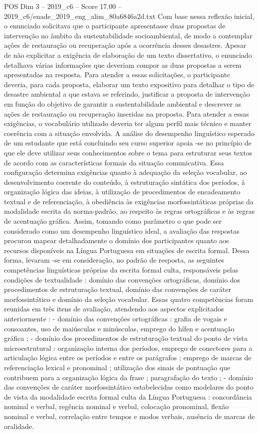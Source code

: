 \begin{textsample}{POS Dim 3 – 2019\_c6 – Score 17.00 – 2019\_c6/enade\_2019\_eng\_alim\_80a6846a2d.txt}
Com base nessa reflexão inicial, o enunciado solicitava que o participante apresentasse duas propostas de intervenção no âmbito da sustentabilidade socioambiental, de modo a contemplar ações de restauração ou recuperação após a ocorrência desses desastres.
Apesar de não explicitar a exigência de elaboração de um texto dissertativo, o enunciado detalhava várias informações que deveriam compor as duas propostas a serem apresentadas na resposta.
Para atender a essas solicitações, o participante deveria, para cada proposta, elaborar um texto expositivo para detalhar o tipo de desastre ambiental a que estava se referindo, justificar a proposta de intervenção em função do objetivo de garantir a sustentabilidade ambiental e descrever as ações de restauração ou recuperação inseridas na proposta.
Para atender a essas exigências, o vocabulário utilizado deveria ter algum perfil mais técnico e manter coerência com a situação envolvida.
A análise do desempenho linguístico esperado de um estudante que está concluindo seu curso superior apoia -se no princípio de que ele deve utilizar seus conhecimentos sobre o tema para estruturar seus textos de acordo com as características formais da situação comunicativa.
Essa configuração determina exigências quanto à adequação da seleção vocabular, ao desenvolvimento coerente do conteúdo, à estruturação sintática dos períodos, à organização lógica das ideias, à utilização de procedimentos de encadeamento textual e de referenciação, à obediência às exigências morfossintáticas próprias da modalidade escrita da norma-padrão, ao respeito às regras ortográficas e às regras de acentuação gráfica.
Assim, tomando como parâmetro o que pode ser considerado como um desempenho linguístico ideal, a avaliação das respostas procurou mapear detalhadamente o domínio dos participantes quanto aos recursos disponíveis na Língua Portuguesa em situações de escrita formal.
Dessa forma, levaram -se em consideração, no padrão de resposta, as seguintes competências linguísticas próprias da escrita formal culta, responsáveis pelas condições de textualidade : domínio das convenções ortográficas, domínio dos procedimentos de estruturação textual, domínio das convenções de caráter morfossintático e domínio da seleção vocabular.
Essas quatro competências foram reunidas em três itens de avaliação, atendendo aos aspectos explicitados anteriormente : - domínio das convenções ortográficas : grafia de vogais e consoantes, uso de maiúsculas e minúsculas, emprego do hífen e acentuação gráfica ; - domínio dos procedimentos de estruturação textual do ponto de vista microestrutural : organização interna dos períodos, emprego de conectores para a articulação lógica entre os períodos e entre os parágrafos ; emprego de marcas de referenciação lexical e pronominal ; utilização dos sinais de pontuação que contribuem para a organização lógica da frase ; paragrafação do texto ; - domínio das convenções de caráter morfossintático estabelecidas como modelares do ponto de vista da modalidade escrita formal culta da Língua Portuguesa : concordância nominal e verbal, regência nominal e verbal, colocação pronominal, flexão nominal e verbal, correlação entre tempos e modos verbais, ausência de marcas de oralidade.

\end{textsample}
